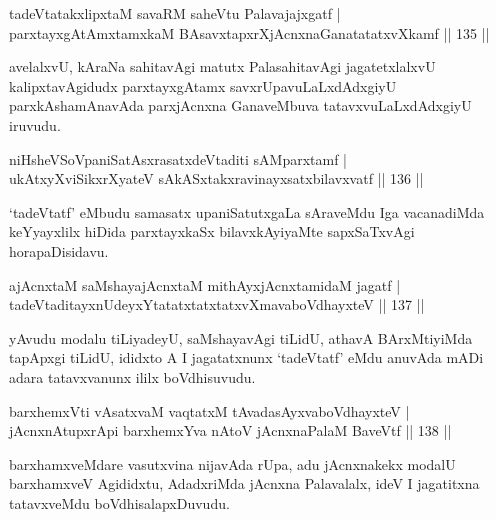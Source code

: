 \begin{shl}
tadeVtatakxlipxtaM savaRM saheVtu Palavajajxgatf |\\
parxtayxgAtAmxtamxkaM BAsavxtapxrXjAcnxnaGanatatatxvXkamf \hfill || 135 ||
\end{shl}

\begin{artha}
avelalxvU, kAraNa sahitavAgi matutx PalasahitavAgi jagatetxlalxvU kalipxtavAgidudx parxtayxgAtamx savxrUpavuLaLxdAdxgiyU parxkAshamAnavAda parxjAcnxna GanaveMbuva tatavxvuLaLxdAdxgiyU iruvudu.
\end{artha}

\begin{shl}
niHsheVSoVpaniSatAsxrasatxdeVtaditi sAMparxtamf |\\
ukAtxyX\s \s viSikxrXyateV sAkASxtakxravinayxsatxbilavxvatf \hfill || 136 ||
\end{shl}

\begin{artha}
`tadeVtatf' eMbudu samasatx upaniSatutxgaLa sAraveMdu Iga vacanadiMda   keYyayxlilx hiDida parxtayxkaSx bilavxkAyiyaMte sapxSaTxvAgi   horapaDisidavu.
\end{artha}

\begin{shl}
ajAcnxtaM saMshayajAcnxtaM mithAyxjAcnxtamidaM jagatf |\\
tadeVtaditayxnUdeyxYtatatxtatxtatxvXmavaboVdhayxteV \hfill || 137 ||
\end{shl}

\begin{artha}
yAvudu modalu tiLiyadeyU, saMshayavAgi tiLidU, athavA BArxMtiyiMda tapApxgi tiLidU, ididxto A I jagatatxnunx `tadeVtatf' eMdu anuvAda mADi adara tatavxvanunx ililx boVdhisuvudu.
\end{artha}

\begin{shl}
barxhemxVti vAsatxvaM vaqtatxM tAvadasAyxvaboVdhayxteV |\\
jAcnxnAtupxrA\s pi barxhemxYva nAtoV jAcnxnaPalaM BaveVtf \hfill || 138 ||
\end{shl}

\begin{artha}
barxhamxveMdare vasutxvina nijavAda rUpa, adu jAcnxnakekx modalU barxhamxveV Agididxtu, AdadxriMda jAcnxna Palavalalx, ideV I jagatitxna tatavxveMdu boVdhisalapxDuvudu.
\end{artha}


